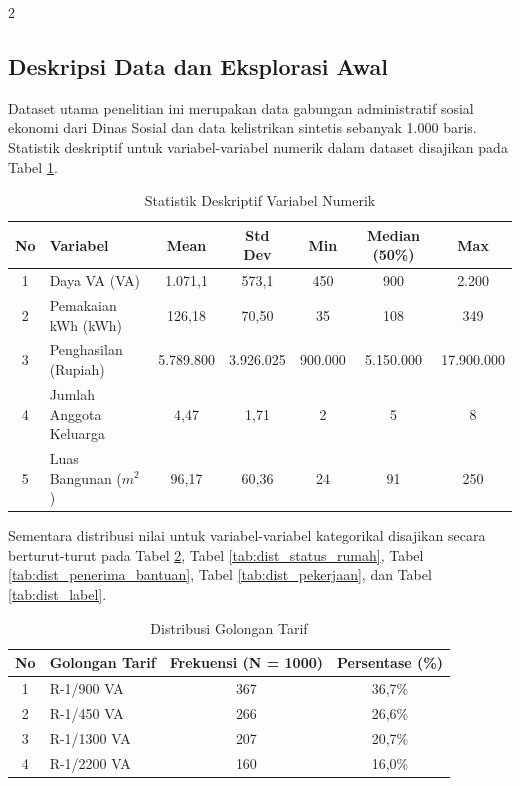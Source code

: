 \documentclass[12pt, a4paper, onecolumn, oneside]{report}
\begin{document}
\begin{spacing}{2}
\subsection{Deskripsi Data dan Eksplorasi Awal}
Dataset utama penelitian ini merupakan data gabungan administratif sosial ekonomi dari Dinas Sosial dan data kelistrikan sintetis sebanyak 1.000 baris. Statistik deskriptif untuk variabel-variabel numerik dalam dataset disajikan pada Tabel \ref{tab:stat_deskriptif}.

\begin{table}[H]
\centering
\caption{Statistik Deskriptif Variabel Numerik}
\label{tab:stat_deskriptif}
\begin{tabular}{|c|l|c|c|c|c|c|}
\hline
\textbf{No} & \textbf{Variabel} & \textbf{Mean} & \textbf{Std Dev} & \textbf{Min} & \textbf{Median (50\%)} & \textbf{Max} \\ \hline
1 & Daya VA (VA) & 1.071,1 & 573,1 & 450 & 900 & 2.200 \\ \hline
2 & Pemakaian kWh (kWh) & 126,18 & 70,50 & 35 & 108 & 349 \\ \hline
3 & Penghasilan (Rupiah) & 5.789.800 & 3.926.025 & 900.000 & 5.150.000 & 17.900.000 \\ \hline
4 & Jumlah Anggota Keluarga & 4,47 & 1,71 & 2 & 5 & 8 \\ \hline
5 & Luas Bangunan ($m^2$) & 96,17 & 60,36 & 24 & 91 & 250 \\ \hline
\end{tabular}
\end{table}

Sementara distribusi nilai untuk variabel-variabel kategorikal disajikan secara berturut-turut pada Tabel \ref{tab:dist_golongan_tarif}, Tabel \ref{tab:dist_status_rumah}, Tabel \ref{tab:dist_penerima_bantuan}, Tabel \ref{tab:dist_pekerjaan}, dan Tabel \ref{tab:dist_label}.

\begin{table}[H]
\centering
\caption{Distribusi Golongan Tarif}
\label{tab:dist_golongan_tarif}
\begin{tabular}{|c|l|c|c|}
\hline
\textbf{No} & \textbf{Golongan Tarif} & \textbf{Frekuensi (N = 1000)} & \textbf{Persentase (\%)} \\ \hline
1 & R-1/900 VA & 367 & 36,7\% \\ \hline
2 & R-1/450 VA & 266 & 26,6\% \\ \hline
3 & R-1/1300 VA & 207 & 20,7\% \\ \hline
4 & R-1/2200 VA & 160 & 16,0\% \\ \hline
\end{tabular}
\end{table}


\end{spacing}
\end{document}
